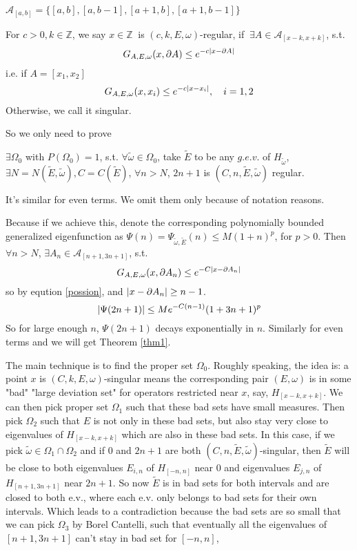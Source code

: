 \begin{definition}
$\mathcal{A}_{[a,b]}=\{[a,b],[a,b-1],[a+1,b],[a+1,b-1]\}$
\end{definition}
\begin{definition}
   For $c>0, k\in\mathbb{Z}$, we say $x\in\mathbb{Z}~$ is $(c,k,E,\omega)$-regular, if $~\exists A\in\mathcal{A}_{[x-k,x+k]}$, s.t.
  \[
    G_{A,E,\omega}(x,\partial A) \leq e^{-c\lvert x-\partial A\rvert}
  \]
  i.e. if $A=[x_1,x_2]$
  \[G_{A,E,\omega}(x,x_i) \leq e^{-c\lvert x-x_i\rvert},\quad i=1,2\]
  Otherwise, we call it singular.
\end{definition}

So we only need to prove
\begin{thm}
  $\exists \Omega_0$ with $P(\Omega_0)=1$, s.t. $\forall \tilde{\omega}\in\Omega_0$, take $\tilde{E}$ to be any $g.e.v.$ of $H_{\tilde{\omega}}$, $\exists N=N(\tilde{E},\tilde{\omega}),C=C(\tilde{E})$, $\forall n>N$, $2n+1$ is $(C,n,\tilde{E},\tilde{\omega})$ regular.
\end{thm}
\begin{remark}
  It's similar for even terms. We omit them only because of notation reasons.
\end{remark}
\begin{remark}
  Because if we achieve this, denote the corresponding polynomially bounded generalized eigenfunction as $\Psi(n)=\Psi_{\tilde{\omega},\tilde{E}}(n)\leq M(1+n)^p$, for $p>0$. Then $\forall n>N$, $\exists A_n\in\mathcal{A}_{[n+1,3n+1]}$, s.t.
  \[
  G_{A,E,\omega}(x,\partial A_n) \leq e^{-C\lvert x-\partial A_n\rvert}
  \]
  so by eqution \ref{possion}, and $\lvert x-\partial A_n\rvert\geq n-1$.
  \[
  \lvert\Psi(2n+1)\rvert\leq Me^{-C(n-1)}(1+3n+1)^p
  \]
  So for large enough $n$, $\Psi(2n+1)$ decays exponentially in $n$. Similarly for even terms and we will get Theorem \ref{thm1}.
\end{remark}

The main technique is to find the proper set $\Omega_0$. Roughly speaking, the idea is: a point $x$ is $(C,k,E,\omega)$-singular means the corresponding pair $(E,\omega)$ is in some "bad" "large deviation set" for operators restricted near $x$, say, $H_{[x-k,x+k]}$. We can then pick proper set $\Omega_1$ such that these bad sets have small measures. Then pick $\Omega_2$ such that $E$ is not only in these bad sets, but also stay very close to eigenvalues of $H_{[x-k,x+k]}$ which are also in these bad sets. In this case, if we pick $\tilde{\omega}\in\Omega_1\cap\Omega_2$ and if $0$ and $2n+1$ are both $(C,n,\tilde{E},\tilde{\omega})$-singular, then $\tilde{E}$ will  be close to both eigenvalues $E_{i,n}$ of $H_{[-n,n]}$ near $0$ and eigenvalues $E_{j,n}$ of $H_{[n+1,3n+1]}$ near $2n+1$. So now $\tilde{E}$ is in bad sets for both intervals and are closed to both e.v., where each e.v. only belongs to bad sets for their own intervals. Which leads to a contradiction because the bad sets are so small that we can pick $\Omega_3$ by Borel Cantelli, such that eventually all the eigenvalues of $[n+1,3n+1]$ can't stay in bad set for $[-n,n]$,



